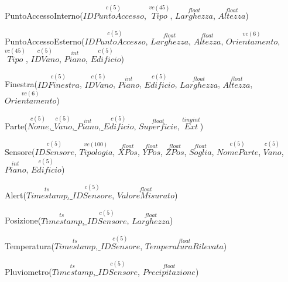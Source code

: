 \documentclass[12pt,a4paper]{report}
\begin{document}
\begin{flushleft}
\begin{footnotesize}
            PuntoAccessoInterno(\underline{$\overset{c(5)}{IDPuntoAccesso}$}, $\overset{vc(45)}{Tipo}$, $\overset{float}{Larghezza}$, $\overset{float}{Altezza}$)
            \vspace{0.5cm}
            
            PuntoAccessoEsterno(\underline{$\overset{c(5)}{IDPuntoAccesso}$}, $\overset{float}{Larghezza}$, $\overset{float}{Altezza}$, $\overset{vc(6)}{Orientamento}$, $\overset{vc(45)}{Tipo}$, $\overset{c(5)}{IDVano}$, $\overset{int}{Piano}$, $\overset{c(5)}{Edificio}$)
            \vspace{0.5cm}
            
            Finestra(\underline{$\overset{c(5)}{IDFinestra}$}, $\overset{c(5)}{IDVano}$, $\overset{int}{Piano}$, $\overset{c(5)}{Edificio}$, $\overset{float}{Larghezza}$, $\overset{float}{Altezza}$, $\overset{vc(6)}{Orientamento}$)        \vspace{0.5cm}
            
            Parte(\underline{$\overset{c(5)}{Nome}$, $\overset{c(5)}{Vano}$, $\overset{int}{Piano}$, $\overset{c(5)}{Edificio}$}, $\overset{float}{Superficie}$, $\overset{tinyint}{Ext}$)
            \vspace{0.5cm}
            
            Sensore(\underline{$\overset{c(5)}{IDSensore}$}, $\overset{vc(100)}{Tipologia}$, $\overset{float}{XPos}$, $\overset{float}{YPos}$, $\overset{float}{ZPos}$, $\overset{float}{Soglia}$, $\overset{c(5)}{NomeParte}$, $\overset{c(5)}{Vano}$, $\overset{int}{Piano}$, $\overset{c(5)}{Edificio}$)
            \vspace{0.5cm}
            
            Alert(\underline{$\overset{ts}{Timestamp}$, $\overset{c(5)}{IDSensore}$}, $\overset{float}{ValoreMisurato}$)
            \vspace{0.5cm}
            
            Posizione(\underline{$\overset{ts}{Timestamp}$, $\overset{c(5)}{IDSensore}$}, $\overset{float}{Larghezza}$)
            \vspace{0.5cm}
            
            Temperatura(\underline{$\overset{ts}{Timestamp}$, $\overset{c(5)}{IDSensore}$}, $\overset{float}{TemperaturaRilevata}$)
            \vspace{0.5cm}
            
            Pluviometro(\underline{$\overset{ts}{Timestamp}$, $\overset{c(5)}{IDSensore}$}, $\overset{float}{Precipitazione}$)
            \vspace{0.5cm}
            

\end{footnotesize}
\end{flushleft}
\end{document}
